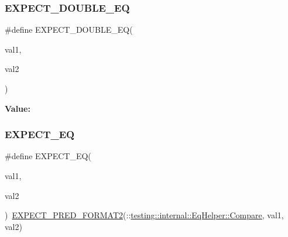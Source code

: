 \subsubsection{\texorpdfstring{EXPECT\_DOUBLE\_EQ}{EXPECT\_DOUBLE\_EQ}}
{\footnotesize\ttfamily \#define E\+X\+P\+E\+C\+T\+\_\+\+D\+O\+U\+B\+L\+E\+\_\+\+EQ(\begin{DoxyParamCaption}\item[{}]{val1,  }\item[{}]{val2 }\end{DoxyParamCaption})}

{\bfseries Value\+:}
\begin{DoxyCode}{0}

\end{DoxyCode}
\mbox{\label{googletest-master_2googletest_2include_2gtest_2gtest_8h_a4159019abda84f5366acdb7604ff220a}} 
\subsubsection{\texorpdfstring{EXPECT\_EQ}{EXPECT\_EQ}}
{\footnotesize\ttfamily \#define E\+X\+P\+E\+C\+T\+\_\+\+EQ(\begin{DoxyParamCaption}\item[{}]{val1,  }\item[{}]{val2 }\end{DoxyParamCaption})~\mbox{\hyperlink{_obj__test_2lib_2googletest-release-1_88_81_2googletest_2include_2gtest_2gtest__pred__impl_8h_af0141918615a5e2d5247e9cda8324dae}{E\+X\+P\+E\+C\+T\+\_\+\+P\+R\+E\+D\+\_\+\+F\+O\+R\+M\+A\+T2}}(\+::\mbox{\hyperlink{classtesting_1_1internal_1_1_eq_helper_a14dd80457029c1ab4a4d04f20003d237}{testing\+::internal\+::\+Eq\+Helper\+::\+Compare}}, val1, val2)}

\mbox{\label{googletest-master_2googletest_2include_2gtest_2gtest_8h_aeb6c7ae89f440c90c1a1815951c836da}} 
